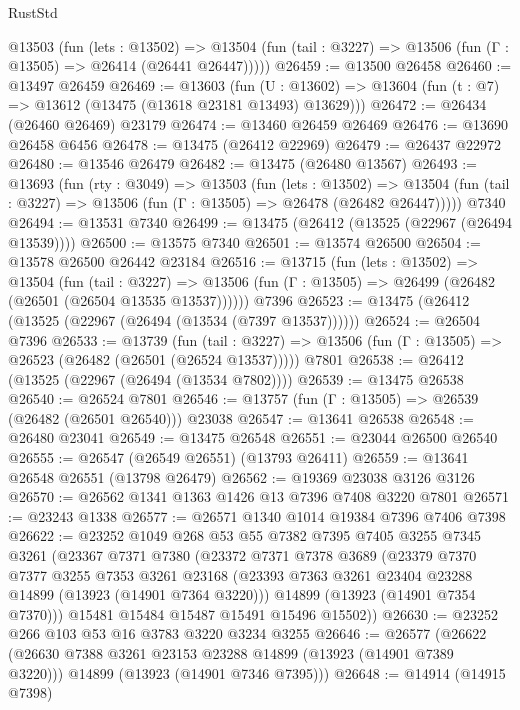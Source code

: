 \begin{lexlean}{RustStd}
\begin{coremodule}
    @13503
      (fun (lets : @13502) =>
      @13504 (fun (tail : @3227) => @13506 (fun (Γ : @13505) => @26414 (@26441 @26447)))))
@26459 := @13500 @26458
@26460 := @13497 @26459
@26469 := @13603
    (fun (U : @13602) => @13604 (fun (t : @7) => @13612 (@13475 (@13618 @23181 @13493) @13629)))
@26472 := @26434 (@26460 @26469) @23179
@26474 := @13460 @26459 @26469
@26476 := @13690 @26458 @6456
@26478 := @13475 (@26412 @22969)
@26479 := @26437 @22972
@26480 := @13546 @26479
@26482 := @13475 (@26480 @13567)
@26493 := @13693
    (fun (rty : @3049) =>
    @13503
      (fun (lets : @13502) =>
      @13504 (fun (tail : @3227) => @13506 (fun (Γ : @13505) => @26478 (@26482 @26447)))))
    @7340
@26494 := @13531 @7340
@26499 := @13475 (@26412 (@13525 (@22967 (@26494 @13539))))
@26500 := @13575 @7340
@26501 := @13574 @26500
@26504 := @13578 @26500 @26442 @23184
@26516 := @13715
    (fun (lets : @13502) =>
    @13504
      (fun (tail : @3227) =>
      @13506 (fun (Γ : @13505) => @26499 (@26482 (@26501 (@26504 @13535 @13537))))))
    @7396
@26523 := @13475 (@26412 (@13525 (@22967 (@26494 (@13534 (@7397 @13537))))))
@26524 := @26504 @7396
@26533 := @13739
    (fun (tail : @3227) => @13506 (fun (Γ : @13505) => @26523 (@26482 (@26501 (@26524 @13537)))))
    @7801
@26538 := @26412 (@13525 (@22967 (@26494 (@13534 @7802))))
@26539 := @13475 @26538
@26540 := @26524 @7801
@26546 := @13757 (fun (Γ : @13505) => @26539 (@26482 (@26501 @26540))) @23038
@26547 := @13641 @26538
@26548 := @26480 @23041
@26549 := @13475 @26548
@26551 := @23044 @26500 @26540
@26555 := @26547 (@26549 @26551) (@13793 @26411)
@26559 := @13641 @26548 @26551 (@13798 @26479)
@26562 := @19369 @23038 @3126 @3126
@26570 := @26562 @1341 @1363 @1426 @13 @7396 @7408 @3220 @7801
@26571 := @23243 @1338
@26577 := @26571 @1340 @1014 @19384 @7396 @7406 @7398
@26622 := @23252
    @1049
    @268
    @53
    @55
    @7382
    @7395
    @7405
    @3255
    @7345
    @3261
    (@23367
      @7371
      @7380
      (@23372
        @7371
        @7378
        @3689
        (@23379
          @7370
          @7377
          @3255
          @7353
          @3261
          @23168
          (@23393 @7363 @3261 @23404 @23288 @14899 (@13923 (@14901 @7364 @3220)))
          @14899
          (@13923 (@14901 @7354 @7370)))
        @15481
        @15484
        @15487
        @15491
        @15496
        @15502))
@26630 := @23252 @266 @103 @53 @16 @3783 @3220 @3234 @3255
@26646 := @26577
    (@26622
      (@26630 @7388 @3261 @23153 @23288 @14899 (@13923 (@14901 @7389 @3220)))
      @14899
      (@13923 (@14901 @7346 @7395)))
@26648 := @14914 (@14915 @7398)

\end{coremodule}
\end{lexlean}
